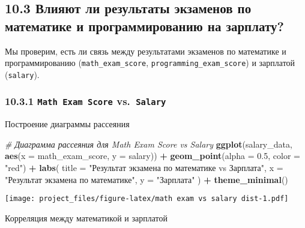 \documentclass[
]{article}
\newenvironment{Shaded}{\begin{snugshade}}{\end{snugshade}}
\newcommand{\AttributeTok}[1]{\textcolor[rgb]{0.13,0.29,0.53}{#1}}
\newcommand{\CommentTok}[1]{\textcolor[rgb]{0.56,0.35,0.01}{\textit{#1}}}
\newcommand{\FloatTok}[1]{\textcolor[rgb]{0.00,0.00,0.81}{#1}}
\newcommand{\FunctionTok}[1]{\textcolor[rgb]{0.13,0.29,0.53}{\textbf{#1}}}
\newcommand{\NormalTok}[1]{#1}
\newcommand{\OtherTok}[1]{\textcolor[rgb]{0.56,0.35,0.01}{#1}}
\newcommand{\SpecialCharTok}[1]{\textcolor[rgb]{0.81,0.36,0.00}{\textbf{#1}}}
\newcommand{\StringTok}[1]{\textcolor[rgb]{0.31,0.60,0.02}{#1}}
\begin{document}
\subsection{10.3 Влияют ли результаты экзаменов по математике и
программированию на
зарплату?}\label{ux432ux43bux438ux44fux44eux442-ux43bux438-ux440ux435ux437ux443ux43bux44cux442ux430ux442ux44b-ux44dux43aux437ux430ux43cux435ux43dux43eux432-ux43fux43e-ux43cux430ux442ux435ux43cux430ux442ux438ux43aux435-ux438-ux43fux440ux43eux433ux440ux430ux43cux43cux438ux440ux43eux432ux430ux43dux438ux44e-ux43dux430-ux437ux430ux440ux43fux43bux430ux442ux443}

Мы проверим, есть ли связь между результатами экзаменов по математике и
программированию (\texttt{math\_exam\_score},
\texttt{programming\_exam\_score}) и зарплатой (\texttt{salary}).

\subsubsection{\texorpdfstring{10.3.1 \texttt{Math\ Exam\ Score}
vs.~\texttt{Salary}}{10.3.1 Math Exam Score vs.~Salary}}\label{math-exam-score-vs.-salary}

Построение диаграммы рассеяния

\begin{Shaded}
\begin{Highlighting}[]
\CommentTok{\# Диаграмма рассеяния для Math Exam Score vs Salary}
\FunctionTok{ggplot}\NormalTok{(salary\_data, }\FunctionTok{aes}\NormalTok{(}\AttributeTok{x =}\NormalTok{ math\_exam\_score, }\AttributeTok{y =}\NormalTok{ salary)) }\SpecialCharTok{+}
  \FunctionTok{geom\_point}\NormalTok{(}\AttributeTok{alpha =} \FloatTok{0.5}\NormalTok{, }\AttributeTok{color =} \StringTok{"red"}\NormalTok{) }\SpecialCharTok{+}
  \FunctionTok{labs}\NormalTok{(}
    \AttributeTok{title =} \StringTok{"Результат экзамена по математике vs Зарплата"}\NormalTok{,}
    \AttributeTok{x =} \StringTok{"Результат экзамена по математике"}\NormalTok{,}
    \AttributeTok{y =} \StringTok{"Зарплата"}
\NormalTok{  ) }\SpecialCharTok{+}
  \FunctionTok{theme\_minimal}\NormalTok{()}
\end{Highlighting}
\end{Shaded}

\texttt{[image: project\_files/figure-latex/math exam vs salary dist-1.pdf]}

Корреляция между математикой и зарплатой

\begin{Shaded}
\end{Shaded}
\end{document}
